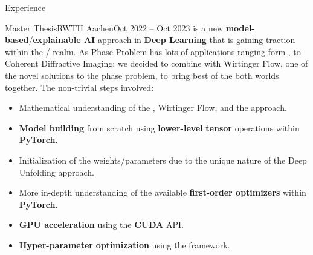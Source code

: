 \begin{cvsection}{Experience}
\begin{cvsubsection}{Master Thesis}{RWTH Aachen}{Oct 2022 -- Oct 2023}
		 is a new \textbf{model-based}/\textbf{explainable AI} approach in \textbf{Deep Learning} that is gaining traction within the / realm. 
		As Phase Problem has lots of applications ranging form ,  to Coherent Diffractive Imaging; 
		we decided to combine  with Wirtinger Flow, one of the novel solutions to the phase problem, to bring best of the both worlds together. The non-trivial steps involved: 
		\begin{itemize}
			\item Mathematical understanding of the , Wirtinger Flow, and the  approach.
			\item \textbf{Model building} from scratch using \textbf{lower-level} \textbf{tensor} operations within \textbf{PyTorch}.
			\item Initialization of the weights/parameters due to the unique nature of the Deep Unfolding approach.
			\item More in-depth understanding of the available \textbf{first-order optimizers} within \textbf{PyTorch}.
			\item \textbf{GPU acceleration} using the \textbf{CUDA} API.
			\item \textbf{Hyper-parameter} \textbf{optimization} using the  framework.
		\end{itemize}
	\end{cvsubsection}

	

\end{cvsection}
